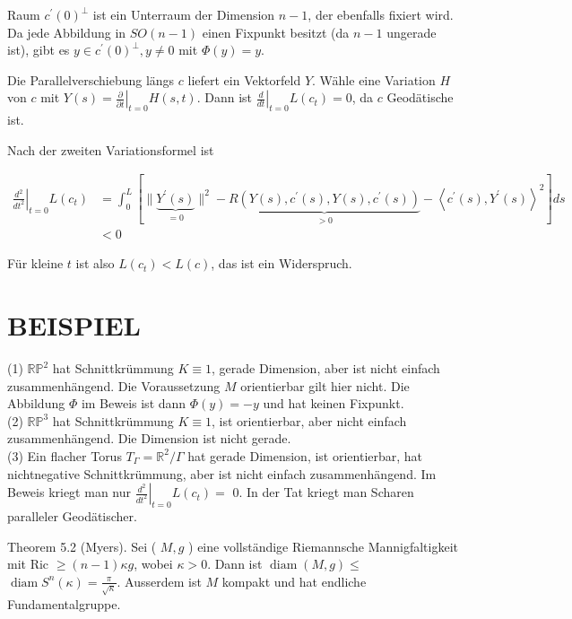 \documentclass[10pt, letterpaper]{article}
\begin{document}
Raum $c^{\prime}(0)^{\perp}$ ist ein Unterraum der Dimension $n-1$, der ebenfalls fixiert wird. Da jede Abbildung in $S O(n-1)$ einen Fixpunkt besitzt (da $n-1$ ungerade ist), gibt es $y \in c^{\prime}(0)^{\perp}, y \neq 0$ mit $\Phi(y)=y$.

Die Parallelverschiebung längs $c$ liefert ein Vektorfeld $Y$. Wähle eine Variation $H$ von $c$ mit $Y(s)=\left.\frac{\partial}{\partial t}\right|_{t=0} H(s, t)$. Dann ist $\left.\frac{d}{d t}\right|_{t=0} L\left(c_{t}\right)=0$, da $c$ Geodätische ist.

Nach der zweiten Variationsformel ist

$$
\begin{aligned}
\left.\frac{d^{2}}{d t^{2}}\right|_{t=0} L\left(c_{t}\right) & =\int_{0}^{L}[\|\underbrace{Y^{\prime}(s)}_{=0}\|^{2}-\underbrace{R\left(Y(s), c^{\prime}(s), Y(s), c^{\prime}(s)\right)}_{>0}-\left\langle c^{\prime}(s), Y^{\prime}(s)\right\rangle^{2}] d s \\
& <0
\end{aligned}
$$

Für kleine $t$ ist also $L\left(c_{t}\right)<L(c)$, das ist ein Widerspruch.

\section*{BEISPIEL}
(1) $\mathbb{R} \mathbb{P}^{2}$ hat Schnittkrümmung $K \equiv 1$, gerade Dimension, aber ist nicht einfach zusammenhängend. Die Voraussetzung $M$ orientierbar gilt hier nicht. Die Abbildung $\Phi$ im Beweis ist dann $\Phi(y)=-y$ und hat keinen Fixpunkt.\\
(2) $\mathbb{R} \mathbb{P}^{3}$ hat Schnittkrümmung $K \equiv 1$, ist orientierbar, aber nicht einfach zusammenhängend. Die Dimension ist nicht gerade.\\
(3) Ein flacher Torus $T_{\Gamma}=\mathbb{R}^{2} / \Gamma$ hat gerade Dimension, ist orientierbar, hat nichtnegative Schnittkrümmung, aber ist nicht einfach zusammenhängend. Im Beweis kriegt man nur $\left.\frac{d^{2}}{d t^{2}}\right|_{t=0} L\left(c_{t}\right)=$ 0. In der Tat kriegt man Scharen paralleler Geodätischer.

Theorem 5.2 (Myers). Sei ( $M, g$ ) eine vollständige Riemannsche Mannigfaltigkeit mit Ric $\geq(n-1) \kappa g$, wobei $\kappa>0$. Dann ist $\operatorname{diam}(M, g) \leq$ $\operatorname{diam} S^{n}(\kappa)=\frac{\pi}{\sqrt{\kappa}}$. Ausserdem ist $M$ kompakt und hat endliche Fundamentalgruppe.
\end{document}
